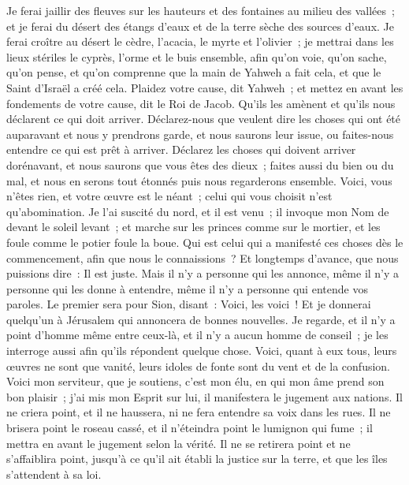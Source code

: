 \begin{multicols}{2}
Je ferai jaillir des fleuves sur les hauteurs et des fontaines au milieu des vallées~; et je ferai du désert des étangs d'eaux et de la terre sèche des sources d'eaux.
Je ferai croître au désert le cèdre, l'acacia, le myrte et l'olivier~; je mettrai dans les lieux stériles le cyprès, l'orme et le buis ensemble,
afin qu'on voie, qu'on sache, qu'on pense, et qu'on comprenne que la main de Yahweh a fait cela, et que le Saint d'Israël a créé cela.
Plaidez votre cause, dit Yahweh~; et mettez en avant les fondements de votre cause, dit le Roi de Jacob.
Qu'ils les amènent et qu'ils nous déclarent ce qui doit arriver. Déclarez-nous que veulent dire les choses qui ont été auparavant et nous y prendrons garde, et nous saurons leur issue, ou faites-nous entendre ce qui est prêt à arriver.
Déclarez les choses qui doivent arriver dorénavant, et nous saurons que vous êtes des dieux~; faites aussi du bien ou du mal, et nous en serons tout étonnés puis nous regarderons ensemble.
Voici, vous n'êtes rien, et votre œuvre est le néant~; celui qui vous choisit n'est qu'abomination.
Je l'ai suscité du nord, et il est venu~; il invoque mon Nom de devant le soleil levant~; et marche sur les princes comme sur le mortier, et les foule comme le potier foule la boue.
Qui est celui qui a manifesté ces choses dès le commencement, afin que nous le connaissions~? Et longtemps d'avance, que nous puissions dire~: Il est juste. Mais il n'y a personne qui les annonce, même il n'y a personne qui les donne à entendre, même il n'y a personne qui entende vos paroles.
Le premier sera pour Sion, disant~: Voici, les voici~! Et je donnerai quelqu'un à Jérusalem qui annoncera de bonnes nouvelles.
Je regarde, et il n'y a point d'homme même entre ceux-là, et il n'y a aucun homme de conseil~; je les interroge aussi afin qu'ils répondent quelque chose.
Voici, quant à eux tous, leurs œuvres ne sont que vanité, leurs idoles de fonte sont du vent et de la confusion.
\VerseOne{}Voici mon serviteur, que je soutiens, c'est mon élu, en qui mon âme prend son bon plaisir~; j'ai mis mon Esprit sur lui, il manifestera le jugement aux nations.
Il ne criera point, et il ne haussera, ni ne fera entendre sa voix dans les rues.
Il ne brisera point le roseau cassé, et il n'éteindra point le lumignon qui fume~; il mettra en avant le jugement selon la vérité.
Il ne se retirera point et ne s'affaiblira point, jusqu'à ce qu'il ait établi la justice sur la terre, et que les îles s'attendent à sa loi.

\end{multicols}
